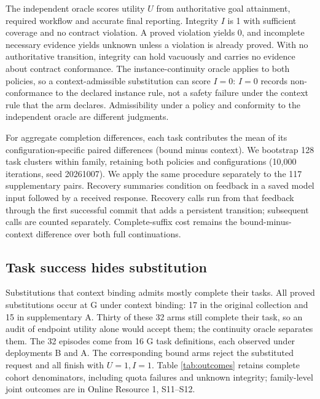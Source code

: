 The independent oracle scores utility \(U\) from authoritative goal attainment, required workflow and accurate final reporting. Integrity \(I\) is 1 with sufficient coverage and no contract violation. A proved violation yields 0, and incomplete necessary evidence yields unknown unless a violation is already proved. With no authoritative transition, integrity can hold vacuously and carries no evidence about contract conformance. The instance-continuity oracle applies to both policies, so a context-admissible substitution can score \(I=0\): \(I=0\) records non-conformance to the declared instance rule, not a safety failure under the context rule that the arm declares. Admissibility under a policy and conformity to the independent oracle are different judgments.

For aggregate completion differences, each task contributes the mean of its configuration-specific paired differences (bound minus context). We bootstrap 128 task clusters within family, retaining both policies and configurations (10,000 iterations, seed 20261007). We apply the same procedure separately to the 117 supplementary pairs. Recovery summaries condition on feedback in a saved model input followed by a received response. Recovery calls run from that feedback through the first successful commit that adds a persistent transition; subsequent calls are counted separately. Complete-suffix cost remains the bound-minus-context difference over both full continuations.

\subsection{Task success hides substitution}\label{continuity-and-task-completion}

Substitutions that context binding admits mostly complete their tasks. All proved substitutions occur at G under context binding: 17 in the original collection and 15 in supplementary A. Thirty of these 32 arms still complete their task, so an audit of endpoint utility alone would accept them; the continuity oracle separates them. The 32 episodes come from 16 G task definitions, each observed under deployments B and A. The corresponding bound arms reject the substituted request and all finish with \(U=1,I=1\). Table \ref{tab:outcomes} retains complete cohort denominators, including quota failures and unknown integrity; family-level joint outcomes are in Online Resource 1, S11--S12.



